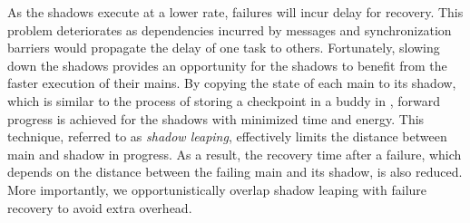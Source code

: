 As the shadows execute at a lower rate, failures will incur delay for recovery. This problem deteriorates as dependencies incurred by messages and synchronization barriers would propagate the delay of one task to others.  
Fortunately, slowing down the shadows provides an opportunity for the shadows to benefit from the faster execution of their mains. By copying the state of each main to its shadow, which is similar to the process of storing a checkpoint in a buddy in \cite{zheng_2004_ftccharm}, forward progress is achieved for the shadows with minimized time and energy. This technique, referred to as \textit{shadow leaping}, effectively limits the distance between main and shadow in progress. 
As a result, the recovery time after a failure, which depends on the distance between the failing main 
and its shadow, is also reduced. 
More importantly, %
we opportunistically overlap shadow leaping with failure recovery to avoid extra overhead. 


